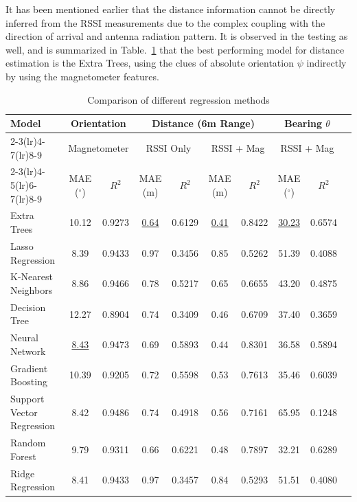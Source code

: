 \documentclass[subscriptcorrection,upint,varvw,barcolor=Goldenrod3,mathalfa=cal=euler,balance,hyphenate,pdf-a]{asmejour}
\begin{document}
It has been mentioned earlier that the distance information cannot be directly inferred from the RSSI measurements due to the complex coupling with the direction of arrival and antenna radiation pattern. It is observed in the testing as well, and is summarized in Table.~\ref{table:distance_orientation_model_compare} that the best performing model for distance estimation is the Extra Trees, using the clues of absolute orientation $\psi$ indirectly by using the magnetometer features.
\begin{table}
\centering
\caption{Comparison of different regression methods}
\label{table:distance_orientation_model_compare}
\begin{tabular}{lccccccccc}
\toprule
\multirow{3}{*}{\textbf{Model}}
  & \multicolumn{2}{c}{\textbf{Orientation}}
  & \multicolumn{4}{c}{\textbf{Distance (6m Range)}}
  & \multicolumn{2}{c}{\textbf{Bearing $\theta$}} \\
\cmidrule(lr){2-3}\cmidrule(lr){4-7}\cmidrule(lr){8-9}
  & \multicolumn{2}{c}{Magnetometer}
  & \multicolumn{2}{c}{RSSI Only}
  & \multicolumn{2}{c}{RSSI + Mag}
  & \multicolumn{2}{c}{RSSI + Mag} \\
\cmidrule(lr){2-3}\cmidrule(lr){4-5}\cmidrule(lr){6-7}\cmidrule(lr){8-9}
  & MAE ($^\circ$) & $R^2$ & MAE (m) & $R^2$ & MAE (m) & $R^2$ & MAE ($^\circ$) & $R^2$ \\
\midrule
Extra Trees              & 10.12 & 0.9273 & \underline{0.64} & 0.6129 & \underline{0.41} & 0.8422 & \underline{30.23} & 0.6574 \\
Lasso Regression         &  8.39 & 0.9433 & 0.97 & 0.3456 & 0.85 & 0.5262 & 51.39 & 0.4088 \\
K-Nearest Neighbors      &  8.86 & 0.9466 & 0.78 & 0.5217 & 0.65 & 0.6655 & 43.20 & 0.4875 \\
Decision Tree            & 12.27 & 0.8904 & 0.74 & 0.3409 & 0.46 & 0.6709 & 37.40 & 0.3659 \\
Neural Network           &  \underline{8.43} & 0.9473 & 0.69 & 0.5893 & 0.44 & 0.8301 & 36.58 & 0.5894 \\
Gradient Boosting        & 10.39 & 0.9205 & 0.72 & 0.5598 & 0.53 & 0.7613 & 35.46 & 0.6039 \\
Support Vector Regression&  8.42 & 0.9486 & 0.74 & 0.4918 & 0.56 & 0.7161 & 65.95 & 0.1248 \\
Random Forest            &  9.79 & 0.9311 & 0.66 & 0.6221 & 0.48 & 0.7897 & 32.21 & 0.6289 \\
Ridge Regression         &  8.41 & 0.9433 & 0.97 & 0.3457 & 0.84 & 0.5293 & 51.51 & 0.4080 \\
\bottomrule
\end{tabular}
\end{table}
\end{document}
